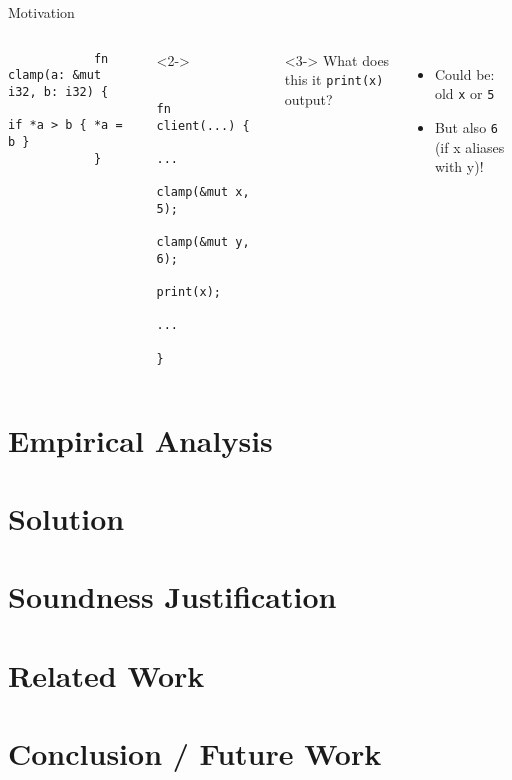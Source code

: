 \documentclass{sdqbeamer}
\newcommand{\code}[1]{\texttt{#1}}
\begin{document}
\begin{frame}[fragile]{Motivation}{}
	\begin{columns}
		\begin{verbatim}
			fn  clamp(a: &mut i32, b: i32) {
				if *a > b { *a = b }
			}
		\end{verbatim}
		\begin{onlyenv}<2->
			\begin{verbatim}
				fn  client(...) {
					...
					clamp(&mut x, 5);
					clamp(&mut y, 6);
					print(x);
					...
				}
			\end{verbatim}
		\end{onlyenv}

		<3->
		What does this it \code{print(x)} output?
		\begin{itemize}
			\item Could be: old \code{x} or \code{5}
			\item<4-> But also \code{6} (if x aliases with y)!
		\end{itemize}
	\end{columns}
\end{frame}

\section{Empirical Analysis}
\section{Solution}
\section{Soundness Justification}
\section{Related Work}
\section{Conclusion / Future Work}
\end{document}
